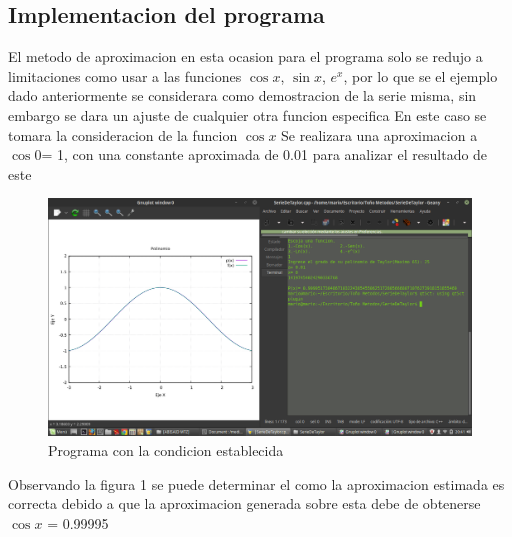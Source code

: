 \documentclass{article}
\begin{document}
\begin{multicols}{2}
\section{Implementacion del programa}
\label{sec:Imp}
El metodo de aproximacion en esta ocasion para el programa solo se redujo a limitaciones como usar a las funciones $\cos x$, $\sin x$, $e^{x}$, por lo que se el ejemplo dado anteriormente se considerara como demostracion de la serie misma, sin embargo se dara un ajuste de cualquier otra funcion especifica
En este caso se tomara la consideracion de la funcion $\cos x$ 
Se realizara una aproximacion a $\cos 0 $= 1, con una constante aproximada de 0.01 para analizar el resultado de este
\begin{figure}[H]
\centering
\includegraphics[scale=.125]{Taylor.png}
\caption{Programa con la condicion establecida}
\end{figure}
Observando la figura 1 se puede determinar el como la aproximacion estimada es correcta debido a que la aproximacion generada sobre esta debe de obtenerse $\cos x$ = 0.99995


\end{multicols}
\end{document}
